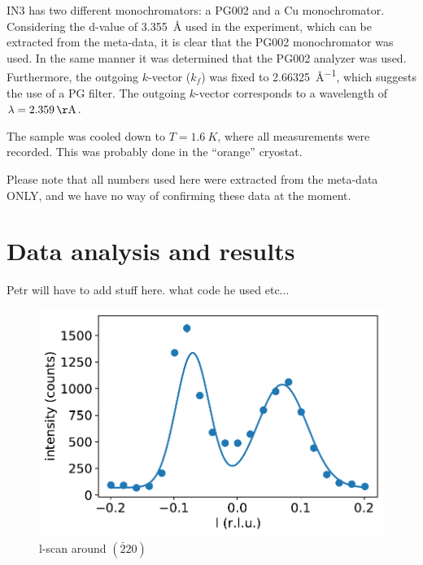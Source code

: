 \documentclass[aps,prx,reprint,amsmath,amssymb,superscriptaddress,showpacs]{revtex4-1}
\begin{document}
IN3 has two different monochromators: a PG002 and a Cu monochromator.
Considering the d-value of \SI{3.355}{\AA} used in the experiment, which can be extracted from the meta-data, it is clear that the PG002 monochromator was used.
In the same manner it was determined that the PG002 analyzer was used. 
Furthermore, the outgoing $k$-vector ($k_f$) was fixed to \SI{2.66325}{\AA^{-1}}, which suggests the use of a PG filter. 
The outgoing $k$-vector corresponds to a wavelength of $\lambda=\SI{2.359}{\AA}$.

The sample was cooled down to $T = \SI{1.6}{K}$, where all measurements were recorded. 
This was probably done in the ``orange'' cryostat.




Please note that all numbers used here were extracted from the meta-data ONLY, and we have no way of confirming these data at the moment. 


\section{Data analysis and results}

Petr will have to add stuff here. what code he used etc...

\begin{figure}
    \includegraphics[width=1.0\linewidth]{energy-scan.pdf}
    \caption{l-scan around $(\bar{2}20)$}
    \label{fig1}
\end{figure}
\end{document}
